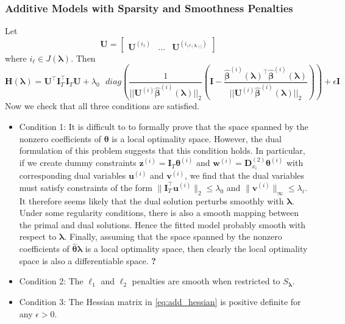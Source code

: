 \documentclass[12pt,letterpaper]{article}
\begin{document}
\subsubsection{Additive Models with Sparsity and Smoothness Penalties}
\label{sec_appendix:sparse_add_models}
Let 
\begin{equation}
\boldsymbol{U} = \begin{bmatrix}
\boldsymbol {U}^{(i_1)} & ... & \boldsymbol {U}^{(i_{|J(\boldsymbol \lambda)|})}
\end{bmatrix}
\end{equation}
where $i_\ell \in J(\boldsymbol \lambda)$. Then
\begin{equation}
\boldsymbol{H}(\boldsymbol\lambda)
= \boldsymbol{U}^\top \boldsymbol I_T^\top \boldsymbol I_T \boldsymbol{U}
+ \lambda_0 \text{ } diag \left (
\frac{1}{||\boldsymbol {U}^{(i)}  \hat{\boldsymbol{\beta}}^{(i)} (\boldsymbol \lambda)||_2} \left (
\boldsymbol I - \frac{\hat{\boldsymbol{\beta}}^{(i)} (\boldsymbol \lambda)^\top \hat{\boldsymbol{\beta}}^{(i)} (\boldsymbol \lambda)}{||\boldsymbol {U}^{(i)}  \hat{\boldsymbol{\beta}}^{(i)} (\boldsymbol \lambda)||_2}
\right ) \right )
+ \epsilon \boldsymbol I
\label{eq:add_hessian}
\end{equation}
Now we check that all three conditions are satisfied.
\begin{itemize}
	\item[] Condition 1: It is difficult to to formally prove that the space spanned by the nonzero coefficients of $\boldsymbol{\theta}$ is a local optimality space. However, the dual formulation of this problem suggests that this condition holds. In particular, if we create dummy constraints $\boldsymbol{z}^{(i)} = \boldsymbol{I}_T\boldsymbol{\theta}^{(i)}$ and $\boldsymbol{w}^{(i)} = \boldsymbol{D}_{x_i}^{(2)} \boldsymbol{\theta}^{(i)}$ with corresponding dual variables $\boldsymbol{u}^{(i)}$ and $\boldsymbol{v}^{(i)}$, we find that the dual variables must satisfy constraints of the form $\|\boldsymbol{I}_T^\top \boldsymbol{u}^{(i)}\|_2 \le \lambda_0$ and $\|\boldsymbol{v}^{(i)}\|_\infty \le \lambda_i$. It therefore seems likely that the dual solution perturbs smoothly with $\boldsymbol{\lambda}$. Under some regularity conditions, there is also a smooth mapping between the primal and dual solutions. Hence the fitted model probably smooth with respect to $\boldsymbol{\lambda}$. Finally, assuming that the space spanned by the nonzero coefficients of $\hat{\boldsymbol{\theta}}\boldsymbol{\lambda}$ is a local optimality space, then clearly the local optimality space is also a differentiable space.
	\hfill {}\textbf{?}
	\item[] Condition 2: The $\ell_1$ and $\ell_2$ penalties are smooth when restricted to $S_{\boldsymbol{\lambda}}$.\hfill {}
	\item[] Condition 3: The Hessian matrix in \eqref{eq:add_hessian} is positive definite for any $\epsilon > 0$. \hfill {}
\end{itemize}
\end{document}
